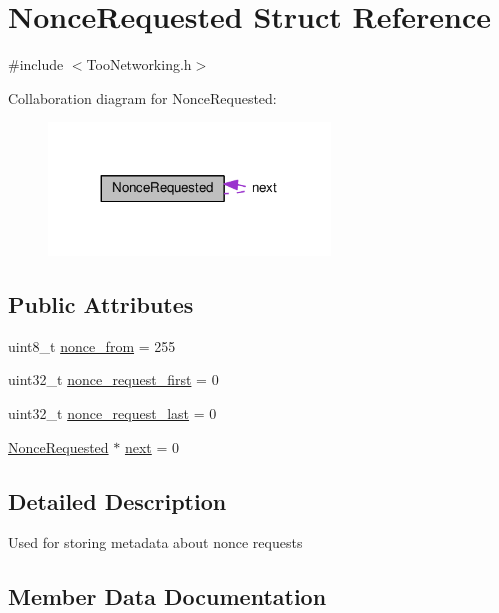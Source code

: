\hypertarget{structNonceRequested}{}\section{Nonce\+Requested Struct Reference}
\label{structNonceRequested}


{\ttfamily \#include $<$Too\+Networking.\+h$>$}



Collaboration diagram for Nonce\+Requested\+:\nopagebreak
\begin{figure}[H]
\begin{center}
\leavevmode
\includegraphics[width=212pt]{structNonceRequested__coll__graph}
\end{center}
\end{figure}
\subsection*{Public Attributes}
\begin{DoxyCompactItemize}
\item 
uint8\+\_\+t \hyperlink{structNonceRequested_a49d5f4e83fa72e51cc37237cc46f3a7e}{nonce\+\_\+from} = 255
\item 
uint32\+\_\+t \hyperlink{structNonceRequested_a9e2f47eec20e01c7cce1acf2d47bbf14}{nonce\+\_\+request\+\_\+first} = 0
\item 
uint32\+\_\+t \hyperlink{structNonceRequested_ae5453d115c1ba4044592921e0127f0c8}{nonce\+\_\+request\+\_\+last} = 0
\item 
\hyperlink{structNonceRequested}{Nonce\+Requested} $\ast$ \hyperlink{structNonceRequested_a2ef35667b6b2cb12f1c845ddc63f16ec}{next} = 0
\end{DoxyCompactItemize}


\subsection{Detailed Description}
Used for storing metadata about nonce requests 

\subsection{Member Data Documentation}

